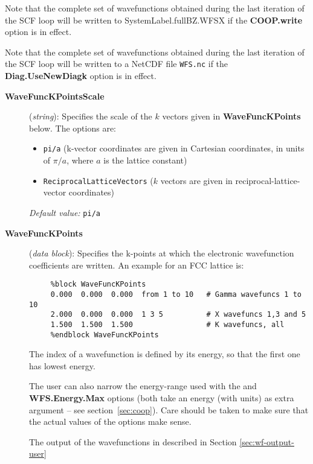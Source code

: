 Note that the complete set of wavefunctions obtained during the last
iteration of the SCF loop will be written to SystemLabel.fullBZ.WFSX
if the \textbf{COOP.write} option is in effect.

Note that the complete set of wavefunctions obtained during the last
iteration of the SCF loop will be written to a NetCDF file
\texttt{WFS.nc} if the \textbf{Diag.UseNewDiagk} option is in effect.

\begin{description}

\item[\textbf{WaveFuncKPointsScale}] (\textit{string}):
Specifies the scale of the $k$ vectors given in
\textbf{WaveFuncKPoints} below.
The options are:
\begin{itemize}
\item \texttt{pi/a} (k-vector coordinates are given in Cartesian
coordinates, in units of $\pi/a$, where $a$ is the lattice constant)
\item \texttt{ReciprocalLatticeVectors} ($k$ vectors are given in
reciprocal-lattice-vector coordinates)
\end{itemize}

\textit{Default value:} \texttt{pi/a}


\item[\textbf{WaveFuncKPoints}] (\textit{data block}):
Specifies the k-points at which the electronic wavefunction
coefficients are written.
An example for an FCC lattice is:

\begin{verbatim}
     %block WaveFuncKPoints
     0.000  0.000  0.000  from 1 to 10   # Gamma wavefuncs 1 to 10
     2.000  0.000  0.000  1 3 5          # X wavefuncs 1,3 and 5
     1.500  1.500  1.500                 # K wavefuncs, all
     %endblock WaveFuncKPoints
\end{verbatim}

The index of a wavefunction is defined by its energy, so that the
first one has lowest energy.

The user can also narrow the energy-range used with the  and \textbf{WFS.Energy.Max} options (both take an
energy (with units) as extra argument -- see
section~\ref{sec:coop}). Care should be taken to make sure that the
actual values of the options make sense.

The output of the wavefunctions in described in Section \ref{sec:wf-output-user}


\end{description}

